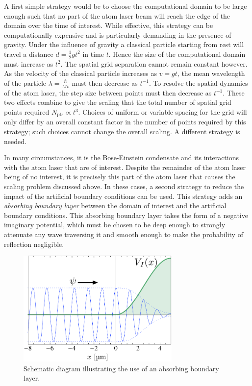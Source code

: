 A first simple strategy would be to choose the computational domain to be large enough such that no part of the atom laser beam will reach the edge of the domain over the time of interest. While effective, this strategy can be computationally expensive and is particularly demanding in the presence of gravity. Under the influence of gravity a classical particle starting from rest will travel a distance $d = \frac{1}{2}g t^2$ in time $t$. Hence the size of the computational domain must increase as $t^2$. The spatial grid separation cannot remain constant however. As the velocity of the classical particle increases as $v = gt$, the mean wavelength of the particle $\displaystyle \lambda = \frac{\hbar}{Mv}$ must then decrease as $t^{-1}$.  To resolve the spatial dynamics of the atom laser, the step size between points must then decrease as $t^{-1}$. These two effects combine to give the scaling that the total number of spatial grid points required $N_\text{pts} \propto t^3$. Choices of uniform or variable spacing for the grid will only differ by an overall constant factor in the number of points required by this strategy; such choices cannot change the overall scaling. A different strategy is needed.

In many circumstances, it is the Bose-Einstein condensate and its interactions with the atom laser that are of interest. Despite the remainder of the atom laser being of no interest, it is precisely this part of the atom laser that causes the scaling problem discussed above. In these cases, a second strategy to reduce the impact of the artificial boundary conditions can be used. This strategy adds an \emph{absorbing boundary layer} \citep{Kosloff:1986,Neuhasuer:1989,Ge:1998} between the domain of interest and the artificial boundary conditions. This absorbing boundary layer takes the form of a negative imaginary potential, which must be chosen to be deep enough to strongly attenuate any wave traversing it and smooth enough to make the probability of reflection negligible. 

\begin{figure}
    \centering
    \includegraphics[width=8cm]{AbsorbingBoundarySchematic}
    \caption{
        \label{BackgroundTheory:AbsorbingBoundarySchematic}
        Schematic diagram illustrating the use of an absorbing boundary layer.
    }
\end{figure}

